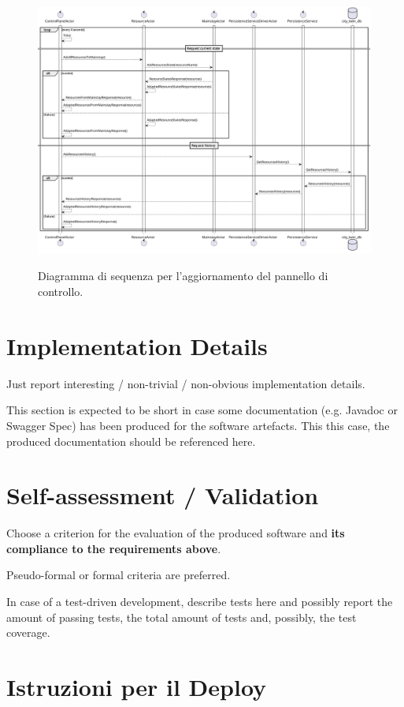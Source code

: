\documentclass{scrartcl}
\begin{document}
\begin{figure}[h]
    \caption{Diagramma di sequenza per l'aggiornamento del pannello di controllo.}
    \includegraphics[width=\textwidth]{../assets/images/control-panel-sequence-diagram.png}
    \label{fig:control-panel-sequence-diagram}
\end{figure}

\section{Implementation Details}

Just report interesting / non-trivial / non-obvious implementation details.

This section is expected to be short in case some documentation (e.g. Javadoc or Swagger Spec) has been produced for the software artefacts.
%
This this case, the produced documentation should be referenced here.

\section{Self-assessment / Validation}

Choose a criterion for the evaluation of the produced software and \textbf{its compliance to the requirements above}.

Pseudo-formal or formal criteria are preferred.

In case of a test-driven development, describe tests here and possibly report the amount of passing tests, the total amount of tests and, possibly, the test coverage.

\section{Istruzioni per il Deploy}
\end{document}
